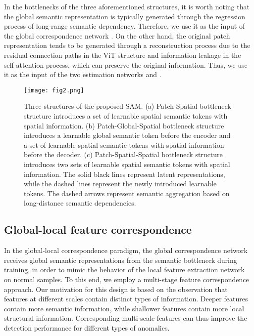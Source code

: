 \documentclass[lettersize,journal]{IEEEtran}
\begin{document}
In the bottlenecks of the three aforementioned structures, it is worth noting that the global semantic representation is typically generated through the regression process of long-range semantic dependency. Therefore, we use it as the input of the global correspondence network . On the other hand, the original patch representation tends to be generated through a reconstruction process due to the residual connection paths in the ViT structure and information leakage in the self-attention process, which can preserve the original information. Thus, we use it as the input of the two estimation networks  and .

\begin{figure*}[t]
\centerline{\texttt{[image: fig2.png]}}
\caption[width=\textwidth]{
Three structures of the proposed SAM. (a) Patch-Spatial bottleneck structure introduces a set of learnable spatial semantic tokens with spatial information. (b) Patch-Global-Spatial bottleneck structure introduces a learnable global semantic token before the encoder and a set of learnable spatial semantic tokens with spatial information before the decoder. (c) Patch-Spatial-Spatial bottleneck structure introduces two sets of learnable spatial semantic tokens with spatial information. The solid black lines represent latent representations, while the dashed lines represent the newly introduced learnable tokens. The dashed arrows represent semantic aggregation based on long-distance semantic dependencies.
}
\label{fig1}
\end{figure*}

\subsection{Global-local feature correspondence}

In the global-local correspondence paradigm, the global correspondence network  receives global semantic representations from the semantic bottleneck during training, in order to mimic the behavior of the local feature extraction network  on normal samples. To this end, we employ a multi-stage feature correspondence approach. Our motivation for this design is based on the observation that features at different scales contain distinct types of information. Deeper features contain more semantic information, while shallower features contain more local structural information. Corresponding multi-scale features can thus improve the detection performance for different types of anomalies.
\end{document}
